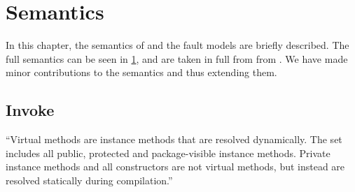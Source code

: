 \chapter{Semantics}\label{chap:semantics}
%
%
%
In this chapter, the semantics of \jcl and the fault models are briefly described. The full semantics can be seen in \cref{chap:semantics}, and are taken in full from from \cite{javasec}. We have made minor contributions to the semantics and thus extending them.



\section{Invoke}
``Virtual methods are instance methods that are resolved dynamically. The set includes all public, protected and package-visible instance methods. Private instance methods and all constructors are not virtual methods, but instead are resolved statically during compilation.'' \cite[chap. 4.3.7.6]{java_card_spec}
